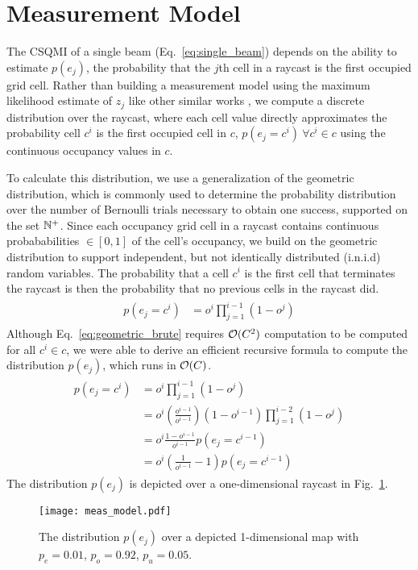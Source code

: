 \section{Measurement Model}
\label{sec:measurement_model}

The CSQMI of a single beam (Eq.~\eqref{eq:single_beam}) depends on the ability
to estimate $p(e_j)$, the probability that the $j$th cell in a raycast is
the first occupied grid cell. Rather than building a measurement model using the
maximum likelihood estimate of $z_{j}$ like other similar works \cite{charrow15,
thrun2005probabilistic, julian2013mutual}, we compute a discrete distribution over the
raycast, where each cell value directly approximates the probability cell $c^i$ is the
first occupied cell in $c$, $p(e_j = c^i) \ \forall c^{i} \in c$ using the
continuous occupancy values in $c$.

To calculate this distribution, we use a generalization of the geometric
distribution, which is commonly used to determine the probability distribution
over the number of Bernoulli trials necessary to obtain one success, supported
on the set ${\mathbb{N}}^{+}$. Since each occupancy grid cell in a raycast contains
continuous probababilities $\in [0, 1]$ of the cell's occupancy, we build on the
geometric distribution to support independent, but not identically distributed
(i.n.i.d) random variables. The probability that a cell $c^{i}$ is the first
cell that terminates the raycast is then the probability that no previous cells
in the raycast did.
%
\begin{align}
  \begin{split}
    p(e_j = c^{i})
    &=
    o^{i}
    \prod_{j=1}^{i-1}
    (1 - o^{j})
    \label{eq:geometric_brute}
  \end{split}
\end{align}
%
Although Eq.~\eqref{eq:geometric_brute} requires $\mathcal{O}(C^2)$ computation to be
computed for all $c^{i} \in c$, we
were able to derive an efficient recursive formula to compute the distribution $p(e_j)$,
which runs in $\mathcal{O}(C)$.
%
\begin{align}
  \begin{split}
    p(e_j = c^{i})
    &=
    o^{i}
    \prod_{j=1}^{i-1}
    (1 - o^{j}) \\
    &=
    o^{i}
    \left(
    \frac
    {o^{i-1}}
    {o^{i-1}}
    \right)
    (1 - o^{i-1})
    \prod_{j=1}^{i-2}
    (1 - o^{j}) \\
    &=
    o^{i}
    \frac
    {
      1 - o^{i-1}
    }
    {
      o^{i-1}
    }
    p(e_j = c^{i-1}) \\
    &=
    o^{i}
    \left(
    \frac{1}{o^{i-1}}
      -
      1
    \right)
    p(e_j = c^{i-1})
  \end{split}
\end{align}
%
The distribution $p(e_j)$ is depicted over a one-dimensional raycast in Fig.~\ref{fig:measurement_model}.

\begin{figure}
  \centering
  \texttt{[image: meas\_model.pdf]}
  \caption{The distribution $p(e_j)$ over a depicted 1-dimensional map with $p_{e} = 0.01$, $p_{o} = 0.92$, $p_{u} = 0.05$. \label{fig:measurement_model}}
\end{figure}

